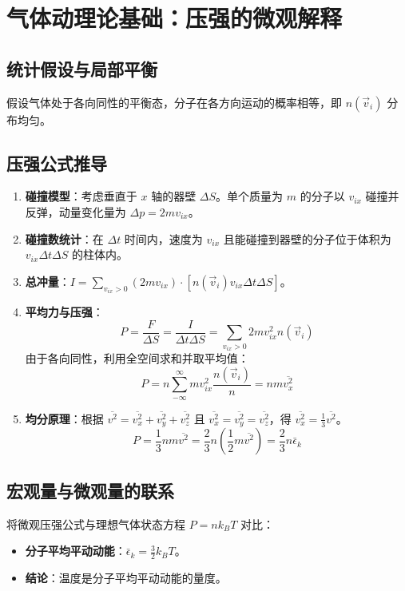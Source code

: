 \documentclass{article}
\begin{document}
\section{气体动理论基础：压强的微观解释}

\subsection{统计假设与局部平衡}
假设气体处于各向同性的平衡态，分子在各方向运动的概率相等，即 $n(\vec{v}_i)$ 分布均匀。

\subsection{压强公式推导}
\begin{enumerate}
    \item \textbf{碰撞模型}：考虑垂直于 $x$ 轴的器壁 $\Delta S$。单个质量为 $m$ 的分子以 $v_{ix}$ 碰撞并反弹，动量变化量为 $\Delta p = 2mv_{ix}$。
    \item \textbf{碰撞数统计}：在 $\Delta t$ 时间内，速度为 $v_{ix}$ 且能碰撞到器壁的分子位于体积为 $v_{ix} \Delta t \Delta S$ 的柱体内。
    \item \textbf{总冲量}：$I = \sum_{v_{ix}>0} (2 m v_{ix}) \cdot [n(\vec{v}_i) v_{ix} \Delta t \Delta S]$。
    \item \textbf{平均力与压强}：
    \[ P = \frac{F}{\Delta S} = \frac{I}{\Delta t \Delta S} = \sum_{v_{ix}>0} 2 m v_{ix}^2 n(\vec{v}_i) \]
    由于各向同性，利用全空间求和并取平均值：
    \[ P = n \sum_{-\infty}^{\infty} m v_{ix}^2 \frac{n(\vec{v}_i)}{n} = n m \overline{v_x^2} \]
    \item \textbf{均分原理}：根据 $\overline{v^2} = \overline{v_x^2} + \overline{v_y^2} + \overline{v_z^2}$ 且 $\overline{v_x^2} = \overline{v_y^2} = \overline{v_z^2}$，得 $\overline{v_x^2} = \frac{1}{3} \overline{v^2}$。
    \[ P = \frac{1}{3} n m \overline{v^2} = \frac{2}{3} n \left( \frac{1}{2} m \overline{v^2} \right) = \frac{2}{3} n \bar{\epsilon}_k \]
\end{enumerate}

\subsection{宏观量与微观量的联系}
将微观压强公式与理想气体状态方程 $P = n k_B T$ 对比：
\begin{itemize}
    \item \textbf{分子平均平动动能}：$\bar{\epsilon}_k = \frac{3}{2} k_B T$。
    \item \textbf{结论}：温度是分子平均平动动能的量度。
\end{itemize}
\end{document}

